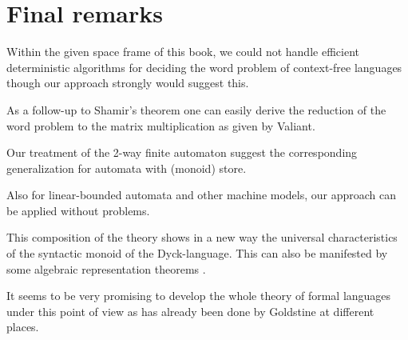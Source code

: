 \chapter*{Final remarks}

Within the given space frame of this book, we could not handle efficient deterministic 
algorithms for deciding the word problem of context-free languages though our
approach strongly would suggest this.

As a follow-up to Shamir's theorem one can easily derive the
reduction of the word problem to the matrix multiplication as given by Valiant.

Our treatment of the 2-way finite automaton suggest the corresponding
generalization for automata with (monoid) store.

Also for linear-bounded automata and other machine models, our approach can be
applied without problems.

This composition of the theory shows in a new way the universal characteristics
of the syntactic monoid of the Dyck-language. This can also be manifested by
some algebraic representation theorems \cite{Ho81}.

It seems to be very promising to develop the whole theory of formal languages
under this point of view as has already been done by Goldstine \cite{Go} at
different places.
